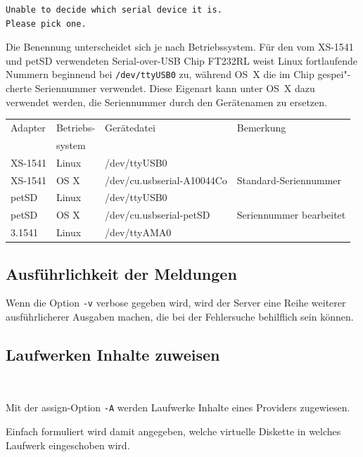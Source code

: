 \documentclass[10pt,a4paper]{scrartcl}		%
\begin{document}
\begin{verbatim}
Unable to decide which serial device it is.
Please pick one.
\end{verbatim}

Die Benennung unterscheidet sich je nach Betriebssystem.
Für den vom XS-1541 und petSD verwendeten Serial-over-USB Chip
FT232RL weist Linux 
fortlaufende Nummern beginnend bei \texttt{/dev/ttyUSB0} 
zu, während
\mbox{OS X} die im Chip gespei"-cherte Seriennummer verwendet. 
Diese Eigenart kann unter \mbox{OS X} dazu verwendet werden, die 
Seriennummer durch den Gerätenamen zu ersetzen.

\begin{tabular}[c]{l l l l}
\toprule 
Adapter & Betriebs- & Gerätedatei & Bemerkung\\
& system & & \\
\midrule
XS-1541 & Linux & /dev/ttyUSB0 & \\
XS-1541 & OS X & /dev/cu.usbserial-A10044Co & Standard-Seriennummer \\
petSD & Linux & /dev/ttyUSB0 & \\
petSD & OS X & /dev/cu.usbserial-petSD & Seriennummer bearbeitet \\
3.1541 & Linux & /dev/ttyAMA0 \\
\bottomrule
\end{tabular}

\subsection{Ausführlichkeit der Meldungen}
\mbox{}

Wenn die Option \texttt{-v} \glqq{}verbose\grqq{} gegeben wird,
wird der Server eine Reihe weiterer ausführlicherer
Ausgaben machen, die bei der Fehlersuche behilflich sein können.

\subsection{Laufwerken Inhalte zuweisen}
\mbox{ \Big[ \texttt{-A}\textit{<Laufwerk-Nummer>} 
\texttt{:} \textit{<Provider>} \texttt{=}
\textit{<Parameter>} \Big] \Big[ \ldots \Big] }

Mit der \glqq{}assign\grqq{}-Option \texttt{-A} werden Laufwerke Inhalte
eines Providers zugewiesen. 

Einfach formuliert wird damit angegeben,
welche \glqq{}virtuelle Diskette\grqq{} in welches Laufwerk
eingeschoben wird. 
\end{document}

